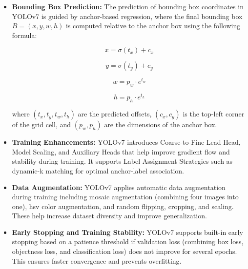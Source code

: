 \begin{itemize}
    \item \textbf{Bounding Box Prediction:} The prediction of bounding box coordinates in YOLOv7 is guided by anchor-based regression, where the final bounding box $B=(x,y,w,h)$ is computed relative to the anchor box using the following formula:
    
    \begin{equation}
    x = \sigma(t_x) + c_x
    \label{eq:bbox-x}
    \end{equation}
    
    \begin{equation}
    y = \sigma(t_y) + c_y
    \label{eq:bbox-y}
    \end{equation}
    
    \begin{equation}
    w = p_w \cdot e^{t_w}
    \label{eq:bbox-w}
    \end{equation}
    
    \begin{equation}
    h = p_h \cdot e^{t_h}
    \label{eq:bbox-h}
    \end{equation}
    
    where $(t_x, t_y, t_w, t_h)$ are the predicted offsets, $(c_x, c_y)$ is the top-left corner of the grid cell, and $(p_w, p_h)$ are the dimensions of the anchor box.
    
    \item \textbf{Training Enhancements:} YOLOv7 introduces Coarse-to-Fine Lead Head, Model Scaling, and Auxiliary Heads that help improve gradient flow and stability during training. It supports Label Assignment Strategies such as dynamic-k matching for optimal anchor-label association.
    
    \item \textbf{Data Augmentation:} YOLOv7 applies automatic data augmentation during training including mosaic augmentation (combining four images into one), \gls{hsv} color augmentation, and random flipping, cropping, and scaling. These help increase dataset diversity and improve generalization.
    
    \item \textbf{Early Stopping and Training Stability:} YOLOv7 supports built-in early stopping based on a patience threshold if validation loss (combining box loss, objectness loss, and classification loss) does not improve for several epochs. This ensures faster convergence and prevents overfitting.
\end{itemize}

